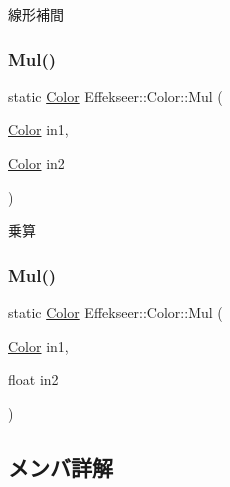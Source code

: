 線形補間 

\mbox{\label{struct_effekseer_1_1_color_a58cd8ceb0f235e9d1251be18ef208ead}} 
\subsubsection{\texorpdfstring{Mul()}{Mul()}\hspace{0.1cm}{\footnotesize\ttfamily [1/2]}}
{\footnotesize\ttfamily static \mbox{\hyperlink{struct_effekseer_1_1_color}{Color}} Effekseer\+::\+Color\+::\+Mul (\begin{DoxyParamCaption}\item[{\mbox{\hyperlink{struct_effekseer_1_1_color}{Color}}}]{in1,  }\item[{\mbox{\hyperlink{struct_effekseer_1_1_color}{Color}}}]{in2 }\end{DoxyParamCaption})\hspace{0.3cm}{\ttfamily [static]}}



乗算 

\mbox{\label{struct_effekseer_1_1_color_a350c4dc2e0b0c35207c53fcc047376c3}} 
\subsubsection{\texorpdfstring{Mul()}{Mul()}\hspace{0.1cm}{\footnotesize\ttfamily [2/2]}}
{\footnotesize\ttfamily static \mbox{\hyperlink{struct_effekseer_1_1_color}{Color}} Effekseer\+::\+Color\+::\+Mul (\begin{DoxyParamCaption}\item[{\mbox{\hyperlink{struct_effekseer_1_1_color}{Color}}}]{in1,  }\item[{float}]{in2 }\end{DoxyParamCaption})\hspace{0.3cm}{\ttfamily [static]}}



\subsection{メンバ詳解}
\mbox{\label{struct_effekseer_1_1_color_a9ced071dfdca28d4da9490d24a958351}} 
